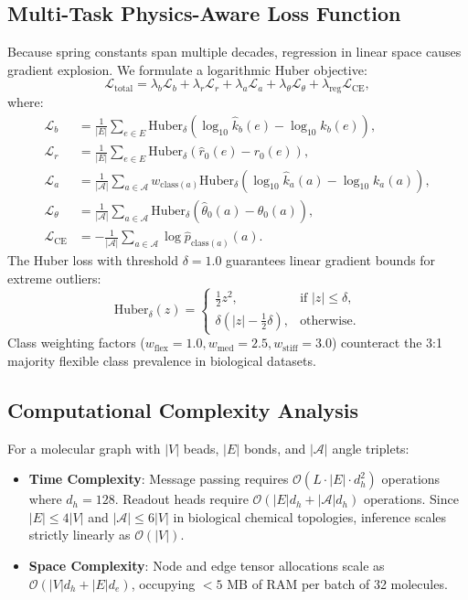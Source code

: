 \documentclass[10pt,journal,compsoc]{IEEEtran}
\begin{document}
\subsection{Multi-Task Physics-Aware Loss Function}
Because spring constants span multiple decades, regression in linear space causes gradient explosion. We formulate a logarithmic Huber objective:
\begin{equation}
\mathcal{L}_{\text{total}} = \lambda_b \mathcal{L}_b + \lambda_r \mathcal{L}_r + \lambda_a \mathcal{L}_a + \lambda_\theta \mathcal{L}_\theta + \lambda_{\text{reg}} \mathcal{L}_{\text{CE}},
\label{eq:loss_total}
\end{equation}
where:
\begin{align}
\mathcal{L}_b &= \frac{1}{|E|} \sum_{e \in E} \text{Huber}_\delta\left( \log_{10} \hat{k}_b(e) - \log_{10} k_b(e) \right), \\
\mathcal{L}_r &= \frac{1}{|E|} \sum_{e \in E} \text{Huber}_\delta\left( \hat{r}_0(e) - r_0(e) \right), \\
\mathcal{L}_a &= \frac{1}{|\mathcal{A}|} \sum_{a \in \mathcal{A}} w_{\text{class}(a)} \text{Huber}_\delta\left( \log_{10} \hat{k}_a(a) - \log_{10} k_a(a) \right), \\
\mathcal{L}_\theta &= \frac{1}{|\mathcal{A}|} \sum_{a \in \mathcal{A}} \text{Huber}_\delta\left( \hat{\theta}_0(a) - \theta_0(a) \right), \\
\mathcal{L}_{\text{CE}} &= -\frac{1}{|\mathcal{A}|} \sum_{a \in \mathcal{A}} \log \hat{p}_{\text{class}(a)}(a).
\end{align}
The Huber loss with threshold $\delta = 1.0$ guarantees linear gradient bounds for extreme outliers:
\begin{equation}
\text{Huber}_\delta(z) = \begin{cases}
\frac{1}{2} z^2, & \text{if } |z| \le \delta, \\
\delta (|z| - \frac{1}{2} \delta), & \text{otherwise}.
\end{cases}
\end{equation}
Class weighting factors ($w_{\text{flex}} = 1.0, w_{\text{med}} = 2.5, w_{\text{stiff}} = 3.0$) counteract the 3:1 majority flexible class prevalence in biological datasets.

\subsection{Computational Complexity Analysis}
For a molecular graph with $|V|$ beads, $|E|$ bonds, and $|\mathcal{A}|$ angle triplets:
\begin{itemize}
    \item \textbf{Time Complexity}: Message passing requires $\mathcal{O}(L \cdot |E| \cdot d_h^2)$ operations where $d_h = 128$. Readout heads require $\mathcal{O}(|E| d_h + |\mathcal{A}| d_h)$ operations. Since $|E| \le 4|V|$ and $|\mathcal{A}| \le 6|V|$ in biological chemical topologies, inference scales strictly linearly as $\mathcal{O}(|V|)$.
    \item \textbf{Space Complexity}: Node and edge tensor allocations scale as $\mathcal{O}(|V| d_h + |E| d_e)$, occupying $< 5\text{ MB}$ of RAM per batch of 32 molecules.
\end{itemize}
\end{document}
